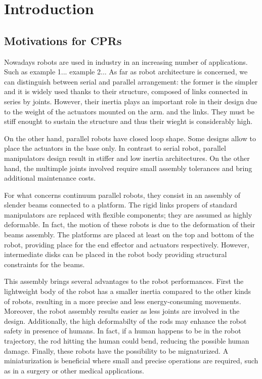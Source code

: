 \documentclass{thesisreport}
\begin{document}
 
 \chapter*{Introduction}
 \section{Motivations for CPRs}
  Nowadays robots are used in industry in an increasing number of applications. Such as example 1... example 2...
 As far as robot architecture is concerned, we can distinguish between serial and parallel arrangement: the former is the simpler and it is widely used thanks to their structure, composed of links connected in series by joints. However, their inertia plays an important role in their design due to the weight of the actuators mounted on the arm. and the links. They must be stiff enought to sustain the structure and thus their wieght is considerably high.
 
 On the other hand, parallel robots have closed loop shape. Some designs allow to place the actuators in the base only. In contrast to serial robot, parallel manipulators design result in stiffer and low inertia architectures. On the other hand, the multimple joints involved require small assembly tolerances and bring additional maintenance costs.
 
 For what concerns continuum parallel robots, they consist in an assembly of slender beams connected to a platform. The rigid links propers of standard manipulators are replaced with flexible components; they are assumed as highly deformable. In fact, the motion of these robots is due to the deformation of their beams assembly.
 The platforms are placed at least on the top and bottom of the robot, providing place for the end effector and actuators respectively. However, intermediate disks can be placed in the robot body providing structural constraints for the beams.  
 
 This assembly brings several advantages to the robot performances. First the lightweight body of the robot has a smaller inertia compared to the other kinds of robots, resulting in a more precise and less energy-consuming movements. Moreover, the robot assembly results easier as less joints are involved in the design. Additionally, the high deformabilty of the rods may enhance the robot safety in presence of humans. In fact, if a human happens to be in the robot trajectory, the rod hitting the human could bend, reducing the possible human damage. Finally, these robots have the possibility to be mignaturized. A miniaturization is beneficial where small and precise operations are required, such as in a surgery or other medical applications. 
 
\end{document}
